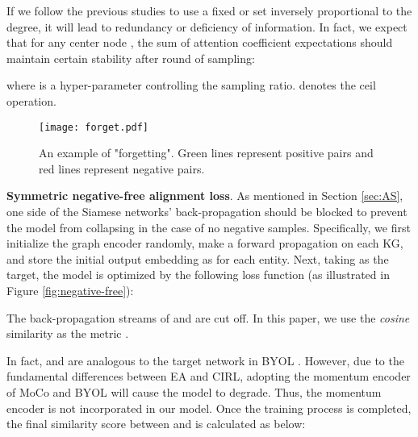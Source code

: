 \documentclass[sigconf]{acmart}
\begin{document}
If we follow the previous studies to use a fixed  or set  inversely proportional to the degree, it will lead to redundancy or deficiency of information.
In fact, we expect that for any center node , the sum of attention coefficient expectations should maintain certain stability after  round of sampling:

where  is a hyper-parameter controlling the sampling ratio.
 denotes the ceil operation.

\begin{figure}[t]
  \centering
  \texttt{[image: forget.pdf]}
  \caption{An example of "forgetting". Green lines represent positive pairs and red lines represent negative pairs.}\label{fig:forget}
  \vspace{-1em}
\end{figure}

\noindent
\textbf{Symmetric negative-free alignment loss}.
As mentioned in Section \ref{sec:AS}, one side of the Siamese networks' back-propagation should be blocked to prevent the model from collapsing in the case of no negative samples.
Specifically, we first initialize the graph encoder randomly, make a forward propagation on each KG, and store the initial output embedding  as  for each entity.
Next, taking  as the target, the model is optimized by the following loss function (as illustrated in Figure \ref{fig:negative-free}):

The back-propagation streams of  and  are cut off.
In this paper, we use the \textit{cosine} similarity as the metric .

In fact,  and  are analogous to the target network in BYOL \cite{DBLP:conf/nips/GrillSATRBDPGAP20}.
However, due to the fundamental differences between EA and CIRL, adopting the momentum encoder of MoCo and BYOL will cause the model to degrade.
Thus, the momentum encoder is not incorporated in our model. Once the training process is completed, the final similarity score between  and  is calculated as below:
\end{document}
